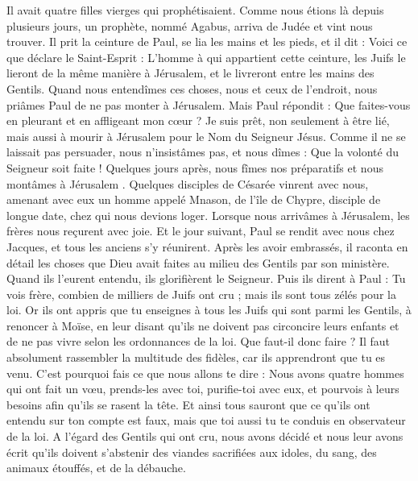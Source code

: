 \begin{multicols}{2}
Il avait quatre filles vierges qui prophétisaient.
Comme nous étions là depuis plusieurs jours, un prophète, nommé Agabus, arriva de Judée
et vint nous trouver. Il prit la ceinture de Paul, se lia les mains et les pieds, et il dit : Voici ce que déclare le Saint-Esprit : L'homme à qui appartient cette ceinture, les Juifs le lieront de la même manière à Jérusalem, et le livreront entre les mains des Gentils.
Quand nous entendîmes ces choses, nous et ceux de l'endroit, nous priâmes Paul de ne pas monter à Jérusalem.
Mais Paul répondit : Que faites-vous en pleurant et en affligeant mon cœur ? Je suis prêt, non seulement à être lié, mais aussi à mourir à Jérusalem pour le Nom du Seigneur Jésus.
Comme il ne se laissait pas persuader, nous n'insistâmes pas, et nous dîmes : Que la volonté du Seigneur soit faite !
Quelques jours après, nous fîmes nos préparatifs et nous montâmes à Jérusalem .
Quelques disciples de Césarée vinrent avec nous, amenant avec eux un homme appelé Mnason, de l'île de Chypre, disciple de longue date, chez qui nous devions loger.
Lorsque nous arrivâmes à Jérusalem, les frères nous reçurent avec joie.
Et le jour suivant, Paul se rendit avec nous chez Jacques, et tous les anciens s'y réunirent.
Après les avoir embrassés, il raconta en détail les choses que Dieu avait faites au milieu des Gentils par son ministère.
Quand ils l'eurent entendu, ils glorifièrent le Seigneur. Puis ils dirent à Paul : Tu vois frère, combien de milliers de Juifs ont cru ; mais ils sont tous zélés pour la loi.
Or ils ont appris que tu enseignes à tous les Juifs qui sont parmi les Gentils, à renoncer à Moïse, en leur disant qu'ils ne doivent pas circoncire leurs enfants et de ne pas vivre selon les ordonnances de la loi.
Que faut-il donc faire ? Il faut absolument rassembler la multitude des fidèles, car ils apprendront que tu es venu.
C'est pourquoi fais ce que nous allons te dire : Nous avons quatre hommes qui ont fait un vœu,
prends-les avec toi, purifie-toi avec eux, et pourvois à leurs besoins afin qu'ils se rasent la tête. Et ainsi tous sauront que ce qu'ils ont entendu sur ton compte est faux, mais que toi aussi tu te conduis en observateur de la loi.
A l'égard des Gentils qui ont cru, nous avons décidé et nous leur avons écrit qu'ils doivent s'abstenir des viandes sacrifiées aux idoles, du sang, des animaux étouffés, et de la débauche.

\end{multicols}

